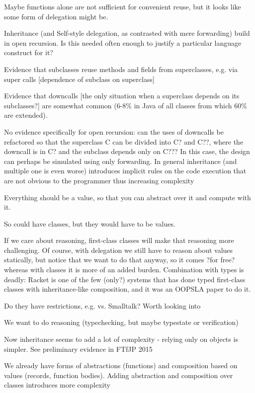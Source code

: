 \documentclass[preprint]{sigplanconf}
\begin{document}
Maybe functions alone are not sufficient for convenient reuse, but it looks like some form of delegation might be.

Inheritance (and Self-style delegation, as contrasted with mere forwarding) build in open recursion.  Is this needed often enough to justify a particular language construct for it?

Evidence that subclasses reuse methods and fields from superclasses, e.g. via super calls [dependence of subclass on superclass]

Evidence that downcalls [the only situation when a superclass depends on its subclasses?] are somewhat common (6-8\% in Java of all classes from which 60\% are extended).

No evidence specifically for open recursion: can the uses of downcalls be refactored so that the superclass C can be divided into C? and C??, where the downcall is in C? and the subclass depends only on C???  In this case, the design can perhaps be simulated using only forwarding.
In general inheritance (and multiple one is even worse) introduces implicit rules on the code execution that are not obvious to the programmer thus increasing complexity

Everything should be a value, so that you can abstract over it and compute with it.

So could have classes, but they would have to be values.

If we care about reasoning, first-class classes will make that reasoning more challenging.  Of course, with delegation we still have to reason about values statically, but notice that we want to do that anyway, so it comes ?for free? whereas with classes it is more of an added burden.  Combination with types is deadly: Racket is one of the few (only?) systems that has done typed first-class classes with inheritance-like composition, and it was an OOPSLA paper to do it.

Do they have restrictions, e.g. vs. Smalltalk?  Worth looking into

We want to do reasoning (typechecking, but maybe typestate or verification)

Now inheritance seems to add a lot of complexity - relying only on objects is simpler.  See preliminary evidence in FTfJP 2015

We already have forms of abstractions (functions) and composition based on values (records, function bodies).  Adding abstraction and composition over classes introduces more complexity
\end{document}
